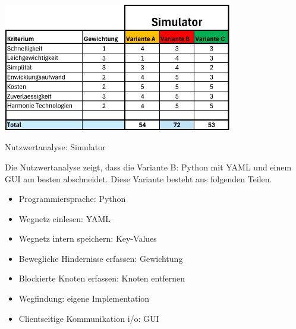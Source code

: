 \begin{table}[H]
\centering
\includegraphics[width=0.75\textwidth]{assets/Nutzwertanalyse-Simulator.pdf}
\caption{Nutzwertanalyse: Simulator}
\label{table:nutzwert-Simulator}
\end{table}

Die Nutzwertanalyse zeigt, dass die Variante B: Python mit YAML und einem GUI am besten abschneidet. Diese Variante besteht aus folgenden Teilen.

\begin{itemize}
    \item Programmiersprache: Python
    \item Wegnetz einlesen: YAML
    \item Wegnetz intern speichern: Key-Values
    \item Bewegliche Hindernisse erfassen: Gewichtung
    \item Blockierte Knoten erfassen: Knoten entfernen
    \item Wegfindung: eigene Implementation
    \item Clientseitige Kommunikation \acrshort{i/o}: GUI
\end{itemize}